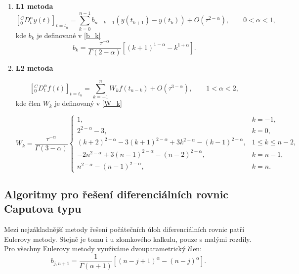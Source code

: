 \documentclass[a4paper,12pt,twoside]{article}
\theoremstyle{definition}
\theoremstyle{remark}
\numberwithin{equation}{section}
\numberwithin{table}{section}
\numberwithin{figure}{section}
\begin{document}
\begin{enumerate}[label=(\textbf{\arabic*})]
	\item \textbf{L1 metoda}
\begin{equation}
		\left[^{C}_{0}D^{\alpha}_{t} y\left(t\right)\right]_{t=t_{n}} = \sum_{k=0}^{n-1} b_{n-k-1}\left(y\left(t_{k+1}\right) - y\left(t_{k}\right)\right) +O\left(\tau^{2-\alpha}\right), \qquad 0<\alpha<1,
\end{equation}
kde $b_k$ je definované v \eqref{b_k}
\begin{equation} \label{b_k}
	b_{k} =  \frac{\tau^{-\alpha}}{\Gamma \left( 2-\alpha \right) } \left[\left(k+1\right)^{1-\alpha} - k^{1+\alpha}\right].
\end{equation}

	\item \textbf{L2 metoda}
	
	\begin{equation}
		\left[ ^{C}_{0}D^{\alpha}_{t} f\left(t\right)\right]_{t=t_{n}} = \sum_{k=-1}^{n} W_{k} f\left(t_{n-k}\right) + O\left(\tau^{3-\alpha}\right), \qquad1<\alpha<2,
	\end{equation}
kde člen $W_{k}$ je definovaný v \eqref{W_k}

\begin{equation} \label{W_k}
	W_{k} = \frac{\tau^{-\alpha}}{\Gamma\left(3-\alpha\right)}
	\begin{cases}
		1, &  k = -1,\\
		2^{2-\alpha} - 3, & k=0, \\
		\left(k+2\right)^{2-\alpha} - 3\left(k+1\right)^{2-\alpha} + 3k^{2-\alpha} - \left(k-1\right)^{2-\alpha}, & 1\leq k \leq n-2, \\
		-2n^{2-\alpha} + 3\left(n-1\right)^{2-\alpha} - \left(n-2\right)^{2-\alpha},  & k = n-1,\\
		n^{2-\alpha} - \left(n-1\right) ^{2-\alpha}, & k=n.	
	\end{cases}
\end{equation}

\end{enumerate}


\subsection{Algoritmy pro řešení diferenciálních rovnic Caputova typu}

Mezi nejzákladnější metody řešení počátečních úloh diferenciálních rovnic  patří Eulerovy metody. Stejně je tomu i u zlomkového kalkulu, pouze s malými rozdíly.
Pro všechny Eulerovy metody využíváme dvouparametrický člen:
\begin{equation} \label{b_j,n}
	b_{j,n+1} = \frac{1}{\Gamma \left(\alpha + 1 \right)} \left[\left(n-j+1\right)^{\alpha} - \left(n-j\right)^{\alpha} \right].
\end{equation}
\end{document}
